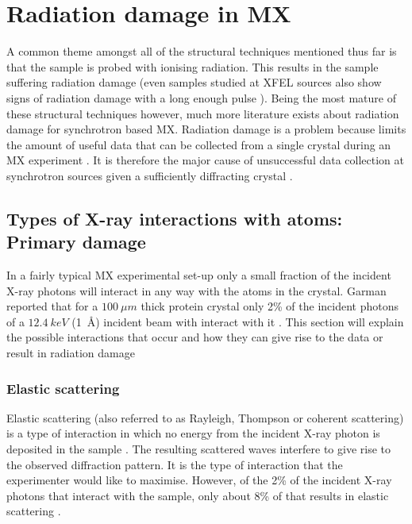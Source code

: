 \section{Radiation damage in MX}
\label{sec:Radiation damage in MX}
    A common theme amongst all of the structural techniques mentioned thus far is that the sample is probed with ionising radiation.
    This results in the sample suffering radiation damage (even samples studied at XFEL sources also show signs of radiation damage with a long enough pulse \cite{nass2015indications}).
    Being the most mature of these structural techniques however, much more literature exists about radiation damage for synchrotron based MX.
    Radiation damage is a problem because limits the amount of useful data that can be collected from a single crystal during an MX experiment \cite{garman2010}.
    It is therefore the major cause of unsuccessful data collection at synchrotron sources given a sufficiently diffracting crystal \cite{zeldin2013dwd}.

    \subsection{Types of X-ray interactions with atoms: Primary damage}
    \label{sub:Types of X-ray interactions with atoms: Primary damage}
        In a fairly typical MX experimental set-up only a small fraction of the incident X-ray photons will interact in any way with the atoms in the crystal. Garman reported that for a $100\ \mu m$ thick protein crystal only 2\% of the incident photons of a $12.4\ keV$ (1\ \AA) incident beam with interact with it \cite{garman2010}.
        This section will explain the possible interactions that occur and how they can give rise to the data or result in radiation damage

        \subsubsection{Elastic scattering}
        \label{subs:Elastic scattering}
            Elastic scattering (also referred to as Rayleigh, Thompson or coherent scattering) is a type of interaction in which no energy from the incident X-ray photon is deposited in the sample \cite{nave1995}.
            The resulting scattered waves interfere to give rise to the observed diffraction pattern.
            It is the type of interaction that the experimenter would like to maximise. However, of the 2\% of the incident X-ray photons that interact with the sample, only about 8\% of that results in elastic scattering \cite{ravelli2006radiation}.

